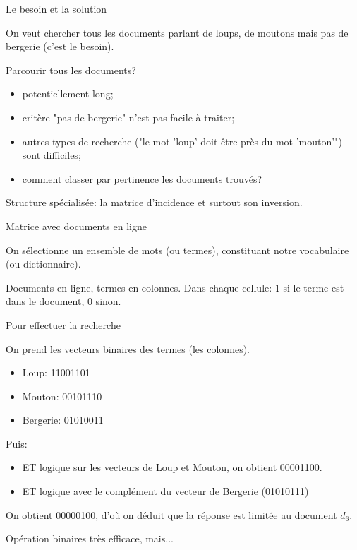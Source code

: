 \begin{frame}{Le besoin et la solution}

On veut chercher tous les documents parlant de loups, de moutons mais pas de bergerie (c’est le besoin).


\medskip

\alert{Parcourir tous les documents?}
\begin{itemize}
  \item  potentiellement long;
  \item critère "pas de bergerie" n'est pas facile à traiter;
  \item  autres types de recherche ("le mot 'loup' doit être \alert{près} du mot 'mouton'") sont
    difficiles;
 \item comment \alert{classer} par pertinence les documents trouvés?
\end{itemize}

\medskip

Structure spécialisée: la \alert{matrice d'incidence} et surtout son inversion.

\end{frame}

\begin{frame}{Matrice avec documents en ligne}

On sélectionne un ensemble de mots (ou \alert{termes}), constituant notre
\alert{vocabulaire} (ou \alert{dictionnaire}).

\vfill

Documents en ligne, termes en colonnes. Dans chaque cellule: 1 si le terme est dans
le document, 0 sinon.

\medskip


\end{frame}


\begin{frame}{Pour effectuer la recherche}

On prend les vecteurs binaires des \alert{termes} (les colonnes).

\begin{itemize}
  \item Loup:      11001101
  \item Mouton:    00101110
  \item Bergerie:    01010011
\end{itemize}

\medskip

Puis:

\begin{itemize}
  \item ET logique sur les vecteurs de Loup et Mouton, on obtient  00001100.
  \item ET logique  avec le \alert{complément} du vecteur de Bergerie (01010111)
\end{itemize}

On obtient 00000100, d'où on déduit que la réponse est limitée au document $d_6$.

\medskip

Opération binaires \alert{très efficace}, mais...

\end{frame}



